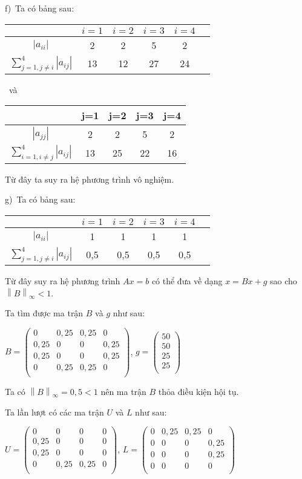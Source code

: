 f)~Ta có bảng sau:
\begin{center}
\begin{tabular}{|Sc|c|c|c|c|}\hline
&$i=1$&$i=2$&$i=3$&$i=4$\\\hline
$\left|a_{ii}\right|$&2&2&5&2\\\hline
$\sum\limits_{j=1,j\neq i}^{4} \left|a_{ij}\right|$&13&12&27&24\\\hline
\end{tabular}~và~
\begin{tabular}{|c|c|c|c|c|}\hline
&j=1&j=2&j=3&j=4\\\hline
$\left|a_{jj}\right|$&2&2&5&2\\\hline
$\sum\limits_{i=1,i\neq j}^{4} \left|a_{ij}\right|$&13&25&22&16\\\hline
\end{tabular}
\end{center}

Từ đây ta suy ra hệ phương trình vô nghiệm.\par

g)~Ta có bảng sau:
\begin{longtable}{|Sc|c|c|c|c|}\hline
&$i=1$&$i=2$&$i=3$&$i=4$\\\hline
\endhead
$\left|a_{ii}\right|$&1&1&1&1\\\hline
$\sum\limits_{j=1,j\neq i}^{4} \left|a_{ij}\right|$&0,5&0,5&0,5&0,5\\\hline
\end{longtable}

Từ đây suy ra hệ phương trình $Ax=b$ có thể đưa về dạng $x=Bx+g$ sao cho $\left\|B\right\|_{\infty} <1$.\par
Ta tìm được ma trận $B$ và $g$ như sau:\par
$B=\begin{pmatrix}
0&0,25&0,25&0\\
0,25&0&0&0,25\\
0,25&0&0&0,25\\
0&0,25&0,25&0\\
\end{pmatrix}$, $g=\begin{pmatrix}
50\\
50\\
25\\
25\\
\end{pmatrix}$

Ta có $\left\|B\right\|_{\infty}= 0,5<1$ nên ma trận $B$ thỏa điều kiện hội tụ.\par
Ta lần lượt có các ma trận $U$ và $L$ như sau:\par
$U=\begin{pmatrix}
0&0&0&0\\
0,25&0&0&0\\
0,25&0&0&0\\
0&0,25&0,25&0\\
\end{pmatrix}$, $L=\begin{pmatrix}
0&0,25&0,25&0\\
0&0&0&0,25\\
0&0&0&0,25\\
0&0&0&0\\
\end{pmatrix}$

